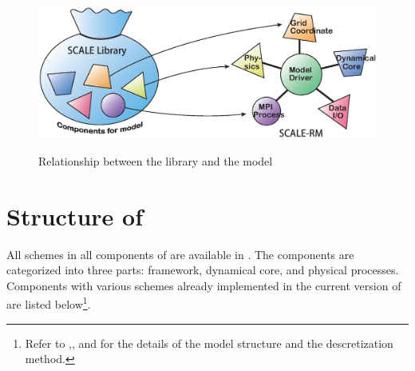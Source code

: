 \begin{figure}[hbt]
\begin{center}
  \includegraphics[width=0.9\hsize]{./figure/scale.eps}\\
  \caption{Relationship between the library \scalelib and the model \scalerm}
  \label{fig:scale-rm}
\end{center}
\end{figure}


\section{Structure of \scalerm}  \label{subsec:sturcture_scale_rm}
All schemes in all components of \scalelib are available in \scalerm.
The components are categorized into three parts:
framework, dynamical core, and physical processes.
Components with various schemes already implemented
in the current version of \scalerm are listed below\footnote{Refer to \citet{scale_2015},\citet{satoy_2015b}, and \citet{nishizawa_2015} for the details of the model structure and the descretization method.}.

